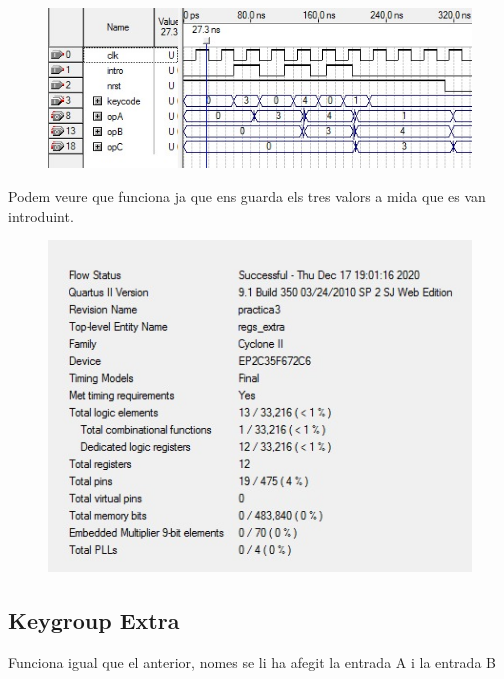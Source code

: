 \documentclass[12pt, a4papre]{article}
\begin{document}
						\begin{figure}[H]
		\begin{center}
		\includegraphics[width=130mm]{simularioRegistreExtra.jpeg}
		\end{center}
	\end{figure}	
	
	Podem veure que funciona ja que ens guarda els tres valors a mida que es van introduint.
	
					\begin{figure}[H]
		\begin{center}
		\includegraphics[width=130mm]{informeRegsExtra.jpeg}
		\end{center}
	\end{figure}	
	
			
			

\subsection{Keygroup Extra}

Funciona igual que el anterior, nomes se li ha afegit la entrada A i la entrada B
\end{document}
